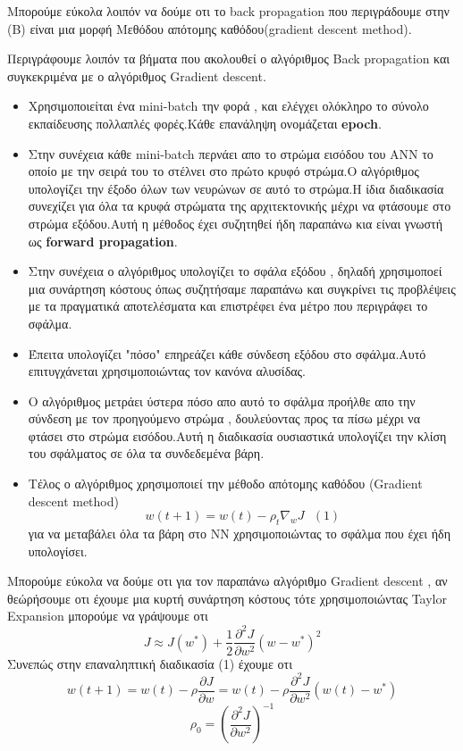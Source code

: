 \documentclass[12pt,a4paper]{article}
\begin{document}
Μπορούμε εύκολα λοιπόν να δούμε οτι το back propagation που περιγράδουμε στην (B) είναι μια μορφή Μεθόδου	απότομης	καθόδου(gradient descent method).

\newpage

Περιγράφουμε λοιπόν τα βήματα που ακολουθεί ο αλγόριθμος Back propagation και συγκεκριμένα με ο αλγόριθμος Gradient descent.
\begin{itemize}
\item Χρησιμοποιείται ένα mini-batch την φορά , και ελέγχει ολόκληρο το σύνολο εκπαίδευσης πολλαπλές φορές.Κάθε επανάληψη ονομάζεται \textbf{epoch}.
\item Στην συνέχεια κάθε mini-batch περνάει απο το στρώμα εισόδου του ANN το οποίο με την σειρά του το στέλνει στο πρώτο κρυφό στρώμα.Ο αλγόριθμος υπολογίζει την έξοδο όλων των νευρώνων σε αυτό το στρώμα.Η ίδια διαδικασία συνεχίζει για όλα τα κρυφά στρώματα της αρχιτεκτονικής μέχρι να φτάσουμε στο στρώμα εξόδου.Αυτή η μέθοδος έχει συζητηθεί ήδη παραπάνω κια είναι γνωστή ως \textbf{forward propagation}.
\item Στην συνέχεια ο αλγόριθμος υπολογίζει το σφάλα εξόδου , δηλαδή χρησιμοποεί μια συνάρτηση κόστους όπως συζητήσαμε παραπάνω και συγκρίνει τις προβλέψεις με τα πραγματικά αποτελέσματα και επιστρέφει ένα μέτρο που περιγράφει το σφάλμα.
\item Έπειτα υπολογίζει "πόσο" επηρεάζει κάθε σύνδεση εξόδου στο σφάλμα.Αυτό επιτυγχάνεται χρησιμοποιώντας τον κανόνα αλυσίδας.

\item Ο αλγόριθμος μετράει ύστερα πόσο απο αυτό το σφάλμα προήλθε απο την σύνδεση με τον προηγούμενο στρώμα , δουλεύοντας προς τα πίσω μέχρι να φτάσει στο στρώμα εισόδου.Αυτή η διαδικασία ουσιαστικά υπολογίζει την κλίση του σφάλματος σε όλα τα συνδεδεμένα βάρη.
\item Τέλος ο αλγόριθμος χρησιμοποιεί την μέθοδο απότομης καθόδου (Gradient descent method)
$$w(t+1) = w(t) - \rho_t \nabla_w J \ \ \  (1)$$
για να μεταβάλει όλα τα βάρη στο NN χρησιμοποιώντας το σφάλμα που έχει ήδη υπολογίσει.
\end{itemize}

Μπορούμε εύκολα να δούμε οτι για τον παραπάνω αλγόριθμο Gradient descent , αν θεώρήσουμε οτι έχουμε μια κυρτή συνάρτηση κόστους τότε χρησιμοποιώντας Taylor Expansion μπορούμε να γράψουμε οτι $$J \approx J(w^*) + \frac{1}{2}\frac{\partial^2 J }{\partial w^2}(w - w^*)^2$$
Συνεπώς στην επαναληπτική διαδικασία (1) έχουμε οτι
$$w(t+1) = w(t) -\rho \frac{\partial J}{\partial w} = w(t) - \rho \frac{\partial ^2 J}{\partial w^2}(w(t) - w^*)$$
$$\rho_0 = (\frac{\partial^2 J}{\partial w^2})^{-1}$$
\end{document}
